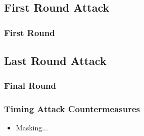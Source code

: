 \documentclass[8pt,handout]{beamer}
\begin{document}
\subsection{First Round Attack}
\begin{frame}
	\frametitle{First Round}
\end{frame}

\subsection{Last Round Attack}
\begin{frame}
	\frametitle{Final Round}
\end{frame}

\begin{frame}
	\frametitle{Timing Attack Countermeasures}
	\begin{itemize}
		\item Masking...
	\end{itemize}
\end{frame}	

\end{document}
